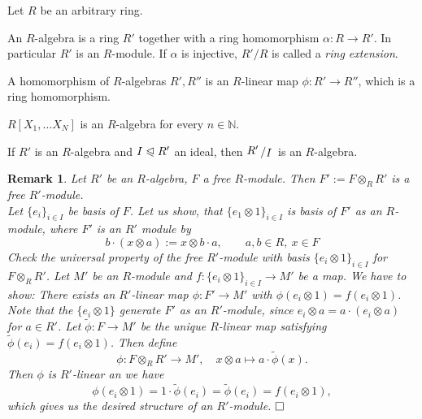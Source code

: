 \documentclass[11pt]{book}
\newtheorem{remark}[theorem]{Remark}
\theoremstyle{nonumberbreak}
\newenvironment{defin}[1][]{\ifthenelse{\equal{#1}{}}{\definition}{\definition[#1]}\rm}{\enddefinition}
\newenvironment{pr}[1][]{\ifthenelse{\equal{#1}{}}{\proof}{\proof[#1]}\rm}{\endproof}
\newenvironment{ex}[1][]{\ifthenelse{\equal{#1}{}}{\example}{\example[#1]}\rm}{\endexample}
\newcommand{\slant}[2]{{\raisebox{.1em}{$#1$}\left/\raisebox{-.1em}{$#2$}\right.}}
\begin{document}
\begin{spacing}{1.3}
\begin{defin} %
Let $R$ be an arbitrary ring.
\begin{compactenum}
\item An $R$-algebra is a ring $R'$ together with a ring homomorphism $\alpha: R \longrightarrow R'$. In particular $R'$ is an $R$-module. If $\alpha$ is injective, $R'/R$ is called a \textit{ring extension}.
\item A homomorphism of $R$-algebras $R', R''$ is an $R$-linear map $\phi: R' \longrightarrow R''$, which is a ring homomorphism.
\end{compactenum}
\end{defin}

\begin{ex}
\begin{compactenum}
\item $R[X_1,\ldots X_N]$ is an $R$-algebra for every $n \in \mathbb{N}$. 
\item If $R'$ is an $R$-algebra and $I \trianglelefteqslant R'$ an ideal, then $\slant{R'}{I}$ is an $R$-algebra.
\end{compactenum}
\end{ex}

\begin{remark} %
Let $R'$ be an $R$-algebra, $F$ a free $R$-module. Then $F':= F \otimes_R R'$ is a free $R'$-module.\\
\begin{pr}
Let $\{e_i\}_{i\in I}$ be basis of $F$. Let us show, that $\{e_1 \otimes 1\}_{i\in I}$ is basis of $F'$ as an $R$-module, where $F'$ is an $R'$ module by 
$$b \cdot (x \otimes a) := x \otimes b \cdot a, \qquad a,b \in R, \ x \in F$$
Check the universal property of the free $R'$-module with basis $\{e_i \otimes 1\}_{i \in I}$ for $F \otimes_R R'$.
Let $M'$ be an $R$-module and $f: \{e_i \otimes 1 \}_{i \in I} \longrightarrow M'$ be a map. 
We have to show: There exists an $R'$-linear map $\phi: F' \longrightarrow M'$ with $\phi(e_i \otimes 1 ) = f (e_i \otimes 1)$.
Note that the $\{e_i \otimes 1 \}$ generate $F'$ as an $R'$-module, since $e_i \otimes a =a \cdot (e_i \otimes a )$ for $a \in R'$.
Let $\tilde{\phi}: F \longrightarrow M'$ be the unique $R$-linear map satisfying $\tilde{\phi}(e_i)= f(e_i\otimes 1)$. Then define 
$$\phi: F \otimes_R R' \longrightarrow M', \quad x \otimes a \mapsto a \cdot \tilde{\phi}(x).$$
Then $\phi$ is $R'$-linear an we have 
$$\phi(e_i \otimes 1)= 1 \cdot \tilde{\phi}(e_i)= \tilde{\phi}(e_i)=f(e_i \otimes 1),$$
which gives us the desired structure of an $R'$-module. $\hfill \Box$
\end{pr}
\end{remark}


\end{spacing}
\end{document}
